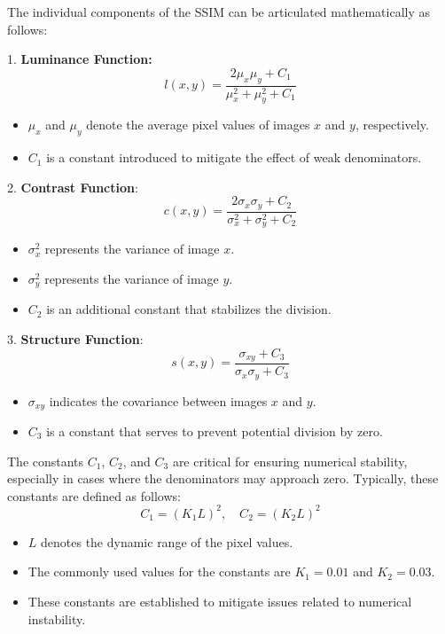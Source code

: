 \documentclass[11pt,
  paper=a4, 
  bibliography=totocnumbered,
	captions=tableheading,
	BCOR=10mm
]{scrreprt}
\theoremstyle{definition}
\begin{document}
The individual components of the SSIM can be articulated mathematically as follows:

\vspace{1cm}
\noindent


 1.  \textbf{ Luminance Function:}
\begin{equation}
	l(x, y) = \frac{2\mu_x\mu_y + C_1}{\mu_x^2 + \mu_y^2 + C_1}
\end{equation}
\begin{itemize}
  \item \(\mu_x\) and \(\mu_y\) denote the average pixel values of images \(x\) and \(y\), respectively.
  \item \(C_1\) is a constant introduced to mitigate the effect of weak denominators.
\end{itemize}

2. \textbf{Contrast Function}:
   \begin{equation}
   c(x, y) = \frac{2\sigma_x \sigma_y + C_2}{\sigma_x^2 + \sigma_y^2 + C_2}
   \end{equation}
\begin{itemize}
	\item \(\sigma_x^2\) represents the variance of image \(x\).
	\item \(\sigma_y^2\) represents the variance of image \(y\).
	\item \(C_2\) is an additional constant that stabilizes the division.
\end{itemize}

3. \textbf{Structure Function}:
\begin{equation}
	s(x, y) = \frac{\sigma_{xy} + C_3}{\sigma_x \sigma_y + C_3}
\end{equation}
\begin{itemize}
	 \item \(\sigma_{xy}\) indicates the covariance between images \(x\) and \(y\).
	 \item \(C_3\) is a constant that serves to prevent potential division by zero.
\end{itemize}
\noindent
The constants \(C_1\), \(C_2\), and \(C_3\) are critical for ensuring numerical stability, especially in cases where the denominators may approach zero. Typically, these constants are defined as follows:
\[
C_1 = (K_1L)^2, \quad C_2 = (K_2L)^2
\]
\begin{itemize}
	\item \(L\) denotes the dynamic range of the pixel values.
	\item The commonly used values for the constants are \(K_1 = 0.01\) and \(K_2 = 0.03\).
	\item These constants are established to mitigate issues related to numerical instability.
\end{itemize}
\end{document}
